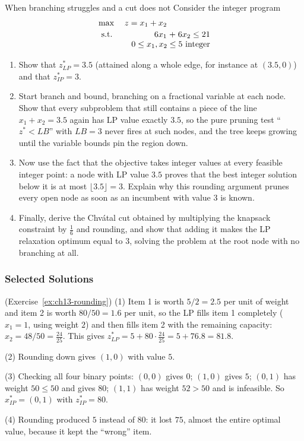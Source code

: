 \begin{ex}{When branching struggles and a cut does not}{}
\label{ex:ch13-weak-relaxation}
Consider the integer program
\[
\begin{array}{l r@{\;}c@{\;}r@{\;}c@{\;}r}
\max & z = x_1 + x_2 & & & & \\[2pt]
\st  & 6x_1 & + & 6x_2 & \leq & 21 \\
     & \multicolumn{5}{r}{0 \leq x_1, x_2 \leq 5 \text{ integer}}
\end{array}
\]
\begin{enumerate}
\item Show that $z^*_{LP} = 3.5$ (attained along a whole edge, for instance
at $(3.5, 0)$) and that $z^*_{IP} = 3$.
\item Start branch and bound, branching on a fractional variable at each
node.  Show that every subproblem that still contains a piece of the line
$x_1 + x_2 = 3.5$ again has LP value exactly $3.5$, so the pure pruning test
``$z^* < LB$'' with $LB = 3$ never fires at such nodes, and the tree keeps
growing until the variable bounds pin the region down.
\item Now use the fact that the objective takes integer values at every
feasible integer point: a node with LP value $3.5$ proves that the best
integer solution below it is at most $\lfloor 3.5 \rfloor = 3$.  Explain why
this rounding argument prunes every open node as soon as an incumbent with
value $3$ is known.
\item Finally, derive the Chv\'atal cut obtained by multiplying the knapsack
constraint by $\tfrac16$ and rounding, and show that adding it makes the LP
relaxation optimum equal to $3$, solving the problem at the root node with no
branching at all.
\end{enumerate}
\exrefs{\S\ref{sec:branch-and-bound}; \S\ref{subsec:chvatal-cuts}; \S\ref{sec:branching-rules}}
\end{ex}

\subsubsection*{Selected Solutions}

\begin{solution}(Exercise~\ref{ex:ch13-rounding})
(1) Item 1 is worth $5/2 = 2.5$ per unit of weight and item 2 is worth
$80/50 = 1.6$ per unit, so the LP fills item 1 completely ($x_1 = 1$, using
weight $2$) and then fills item 2 with the remaining capacity:
$x_2 = 48/50 = \tfrac{24}{25}$.  This gives
$z^*_{LP} = 5 + 80 \cdot \tfrac{24}{25} = 5 + 76.8 = 81.8$.

(2) Rounding down gives $(1, 0)$ with value $5$.

(3) Checking all four binary points: $(0,0)$ gives $0$; $(1,0)$ gives $5$;
$(0,1)$ has weight $50 \leq 50$ and gives $80$; $(1,1)$ has weight
$52 > 50$ and is infeasible.  So $x^*_{IP} = (0,1)$ with $z^*_{IP} = 80$.

(4) Rounding produced $5$ instead of $80$: it lost $75$, almost the entire
optimal value, because it kept the ``wrong'' item.
\end{solution}

